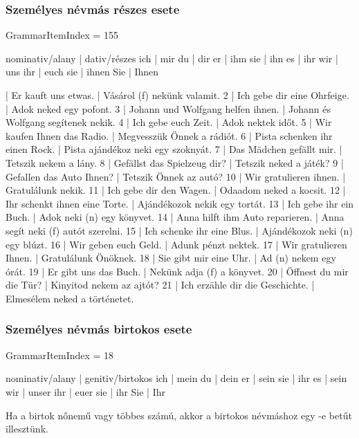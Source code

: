 \documentclass{article}
\newenvironment{desc}{\verbatim}{\endverbatim}
\newenvironment{exmp}{\verbatim}{\endverbatim}
\begin{document}
\subsubsection{Személyes névmás részes esete}

GrammarItemIndex = 155

\begin{desc}
nominativ/alany | dativ/részes 
ich             | mir 
du              | dir 
er              | ihm 
sie             | ihn
es              | ihr 
wir             | uns 
ihr             | euch 
sie             | ihnen  
Sie             | Ihnen 
\end{desc}

\begin{exmp}
1 | Er kauft uns etwas. | Vásárol (f) nekünk valamit.
2 | Ich gebe dir eine Ohrfeige. | Adok neked egy pofont.
3 | Johann und Wolfgang helfen ihnen. | Johann és Wolfgang segítenek nekik.
4 | Ich gebe euch Zeit. | Adok nektek időt.
5 | Wir kaufen Ihnen das Radio. | Megvesszük Önnek a rádiót.
6 | Pista schenken ihr einen Rock. | Pista ajándékoz neki egy szoknyát.
7 | Das Mädchen gefällt mir. | Tetszik nekem a lány.
8 | Gefällst das Spielzeug dir? | Tetszik neked a játék?
9 | Gefallen das Auto Ihnen? | Tetszik Önnek az autó?
10 | Wir gratulieren ihnen. | Gratulálunk nekik.
11 | Ich gebe dir den Wagen. | Odaadom neked a kocsit.
12 | Ihr schenkt ihnen eine Torte. | Ajándékozok nekik egy tortát.
13 | Ich gebe ihr ein Buch. | Adok neki (n) egy könyvet.
14 | Anna hilft ihm Auto reparieren. | Anna segít neki (f) autót szerelni.
15 | Ich schenke ihr eine Blus. | Ajándékozok neki (n) egy blúzt.
16 | Wir geben euch Geld. | Adunk pénzt nektek.
17 | Wir gratulieren Ihnen. | Gratulálunk Önöknek.
18 | Sie gibt mir eine Uhr. | Ad (n) nekem egy órát.
19 | Er gibt uns das Buch. | Nekünk adja (f) a könyvet.
20 | Öffnest du mir die Tür? | Kinyitod nekem az ajtót?
21 | Ich erzähle dir die Geschichte. | Elmesélem neked a történetet.
\end{exmp}

\subsubsection{Személyes névmás birtokos esete}

GrammarItemIndex = 18

\begin{desc}
nominativ/alany | genitiv/birtokos 
ich             | mein
du              | dein
er              | sein
sie             | ihr
es              | sein
wir             | unser
ihr             | euer
sie             | ihr
Sie             | Ihr

Ha a birtok nőnemű vagy többes számú, akkor a birtokos névmáshoz
egy -e betűt illesztünk.
\end{desc}
\end{document}
